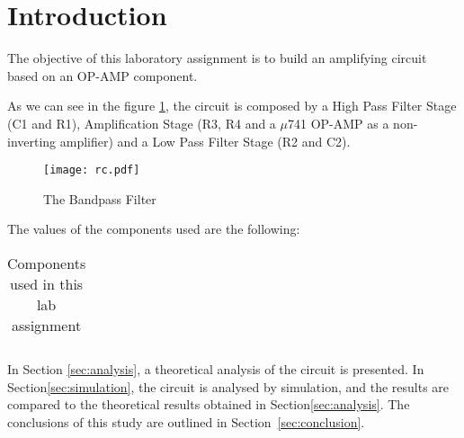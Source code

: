 \section{Introduction}
\label{sec:introduction}

The objective of this laboratory assignment is to build an amplifying circuit based on an OP-AMP component.

As we can see in the figure \ref{fig:rc}, the circuit is composed by a High Pass Filter Stage (C1 and R1), Amplification Stage (R3, R4 and a $\mu$741 OP-AMP as a non-inverting amplifier) and a Low Pass Filter Stage (R2 and C2).

\begin{figure}[h] \centering
\texttt{[image: rc.pdf]}
\vspace{-5mm}
\caption{The Bandpass Filter}\label{fig:rc}
\end{figure}

The values of the components used are the following:

\begin{table}[!htb]
\centering
  \begin{tabular}{|c|c|}
    \hline    
    
 \end{tabular}
 \caption{Components used in this lab assignment}\label{tab:components}
\end{table}


In Section \ref{sec:analysis}, a theoretical analysis of the circuit is presented. In Section\ref{sec:simulation}, the circuit is analysed by simulation, and the results are compared to the theoretical results obtained in Section\ref{sec:analysis}. The conclusions of this study are outlined in Section~\ref{sec:conclusion}.






